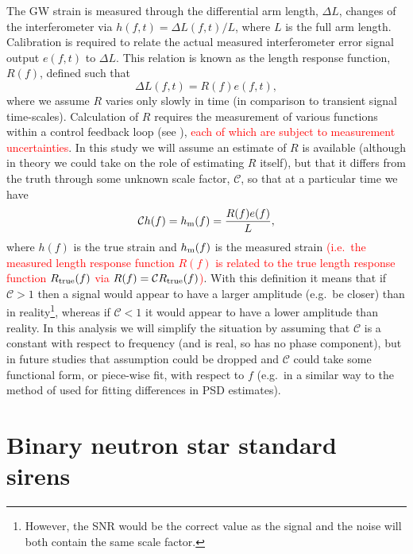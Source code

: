 \documentclass[prd, twocolumn, lengthcheck, superscriptaddress, showpacs, letterpaper, nofootinbib]{revtex4-1}
\newcommand{\scf}{\ensuremath{\mathcal{C}}}
\newcommand{\refresp}[1]{\textcolor{red}{#1}}
\begin{document}
The \ac{GW} strain is measured through the differential arm length, $\Delta L$, changes of the 
interferometer via $h(f,t) = \Delta L(f,t) / L$, where $L$ is the full arm length. Calibration is 
required to relate the actual measured interferometer error signal output $e(f, t)$ to $\Delta L$. 
This relation is known as the length response function, $R(f)$, defined such that
\begin{equation}
\Delta L(f,t) = R(f) e(f, t),
\end{equation}
where we assume $R$ varies only slowly in time (in comparison to transient signal 
time-scales). Calculation of $R$ requires the measurement of various functions within a control 
feedback loop (see \cite{2010NIMPA.624..223A}), \refresp{each of which are subject to measurement uncertainties}. In this 
study we will assume an estimate of $R$ is available (although in theory we could take on the role 
of estimating $R$ itself), but that it differs from the truth through some unknown scale factor, 
$\scf$, so that at a particular time we have
\begin{equation}\label{eq:scalefactor}
\scf h(f) = h_{\rm m}(f) = \frac{R(f) e(f)}{L},
\end{equation}
where $h(f)$ is the true strain and $h_{\rm m}(f)$ is the measured strain \refresp{(i.e.\
the measured length response function $R(f)$ is related to the true length response function $R_{\rm true}(f)$
via $R(f) = \scf R_{\rm true}(f)$)}. With this definition it
means that if $\scf > 1$ then a signal would appear to have a larger amplitude (e.g.\ be 
closer) than in reality\footnote{However, the \ac{SNR} would be the correct value as the signal and 
the noise will both contain the same scale factor.}, whereas if $\scf < 1$ it would appear to have a 
lower amplitude than reality. In this analysis we will simplify the situation by assuming that 
$\scf$ is a constant with respect to frequency (and is real, so has no phase component), but in future studies that assumption could be 
dropped and $\scf$ could take some functional form, or piece-wise fit, with respect to $f$ (e.g.\ 
in a similar way to the method of \cite{2013PhRvD..88h4044L} used for fitting differences in 
\ac{PSD} estimates).

\section{Binary neutron star standard sirens\label{sec:sirens}}
\end{document}
